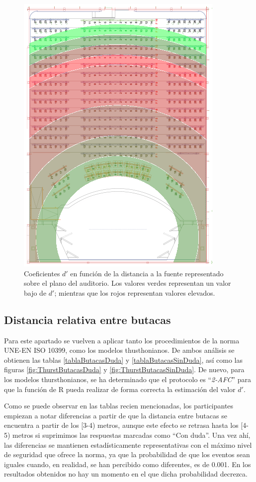 \documentclass[11pt,a4paper,twoside]{book}
\begin{document}
            \begin{figure}[H]
                \includegraphics[scale=0.9]{../imagenes/auditoriodprime.png}
			    \centering
			    \caption{Coeficientes $d'$ en función de la distancia a la fuente representado sobre el plano del auditorio. Los valores verdes representan un valor bajo de $d'$; mientras que los rojos representan valores elevados.} 
			    \label{fig:dprimeauditorio}
            \end{figure}
        
        \subsection{Distancia relativa entre butacas}
            Para este apartado se vuelven a aplicar tanto los procedimientos de la norma UNE-EN ISO 10399, como los modelos thusthonianos. De ambos análisis se obtienen las tablas \ref{tablaButacasDuda} y \ref{tablaButacasSinDuda}, así como las figuras \ref{fig:ThurstButacasDuda} y \ref{fig:ThurstButacasSinDuda}. De nuevo, para los modelos thursthonianos, se ha determinado que el protocolo es ``\textit{2-AFC}'' para que la función de R pueda realizar de forma correcta la estimación del valor $d'$.
            
            Como se puede observar en las tablas recien mencionadas, los participantes empiezan a notar diferencias a partir de que la distancia entre butacas se encuentra a partir de los [3-4) metros, aunque este efecto se retrasa hasta los [4-5) metros si suprimimos las respuestas marcadas como ``Con duda''. Una vez ahí, las diferencias se mantienen estadísticamente representativas con el máximo nivel de seguridad que ofrece la norma, ya que la probabilidad de que los eventos sean iguales cuando, en realidad, se han percibido como diferentes, es de 0.001. En los resultados obtenidos no hay un momento en el que dicha probabilidad decrezca.
            
\end{document}
